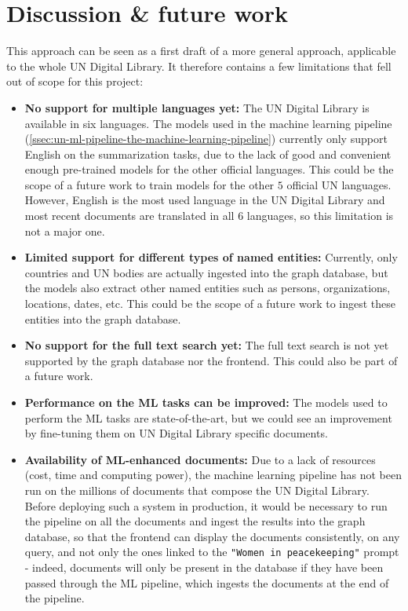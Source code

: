 
\section{Discussion \& future work} \label{sec:discussion-future-work}

This approach can be seen as a first draft of a more general approach, applicable to the whole UN Digital Library. It therefore contains a few limitations that fell out of scope for this project:


\begin{itemize}
    \item \textbf{No support for multiple languages yet:} The UN Digital Library is available in six languages. The models used in the machine learning pipeline (\ref{ssec:un-ml-pipeline-the-machine-learning-pipeline}) currently only support English on the summarization tasks, due to the lack of good and convenient enough pre-trained models for the other official languages. This could be the scope of a future work to train models for the other $5$ official UN languages. However, English is the most used language in the UN Digital Library and most recent documents are translated in all $6$ languages, so this limitation is not a major one.

    \item \textbf{Limited support for different types of named entities:} Currently, only countries and UN bodies are actually ingested into the graph database, but the models also extract other named entities such as persons, organizations, locations, dates, etc. This could be the scope of a future work to ingest these entities into the graph database.

    \item \textbf{No support for the full text search yet:} The full text search is not yet supported by the graph database nor the frontend. This could also be part of a future work.

    \item \textbf{Performance on the ML tasks can be improved:} The models used to perform the ML tasks are state-of-the-art, but we could see an improvement by fine-tuning them on UN Digital Library specific documents.

    \item \textbf{Availability of ML-enhanced documents:} Due to a lack of resources (cost, time and computing power), the machine learning pipeline has not been run on the millions of documents that compose the UN Digital Library. Before deploying such a system in production, it would be necessary to run the pipeline on all the documents and ingest the results into the graph database, so that the frontend can display the documents consistently, on any query, and not only the ones linked to the \texttt{"Women in peacekeeping"} prompt - indeed, documents will only be present in the database if they have been passed through the ML pipeline, which ingests the documents at the end of the pipeline.

\end{itemize}


